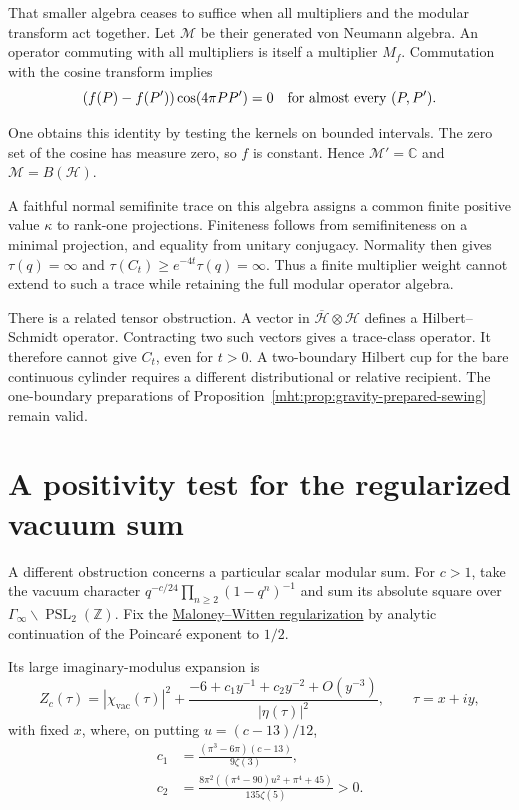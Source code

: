 That smaller algebra ceases to suffice when all multipliers and the
modular transform act together. Let $\mathcal M$ be their generated
von Neumann algebra. An operator commuting with all multipliers is
itself a multiplier $M_f$. Commutation with the cosine transform
implies
\[
 (f(P)-f(P'))\cos(4\pi PP')=0
 \quad\hbox{for almost every }(P,P').
\]

One obtains this identity by testing the kernels on bounded
intervals. The zero set of the cosine has measure zero, so $f$ is
constant. Hence $\mathcal M'= \mathbb C$ and
$\mathcal M=B(\mathcal H)$.

A faithful normal semifinite trace on this algebra assigns a common
finite positive value $\kappa$ to rank-one projections. Finiteness
follows from semifiniteness on a minimal projection, and equality
from unitary conjugacy. Normality then gives $\tau(q)=\infty$ and
$\tau(C_t)\geq e^{-4t}\tau(q)=\infty$.
Thus a finite multiplier weight cannot extend to such a trace while
retaining the full modular operator algebra.

There is a related tensor obstruction. A vector in
$\overline{\mathcal H}\otimes\mathcal H$ defines a
Hilbert--Schmidt operator. Contracting two such vectors gives a
trace-class operator. It therefore cannot give $C_t$, even for
$t>0$. A two-boundary Hilbert cup for the bare continuous cylinder
requires a different distributional or relative recipient.
The one-boundary preparations of
Proposition~\ref{mht:prop:gravity-prepared-sewing} remain valid.

\section{A positivity test for the regularized vacuum sum}

A different obstruction concerns a particular scalar modular sum.
For $c>1$, take the vacuum character
$q^{-c/24}\prod_{n\geq2}(1-q^n)^{-1}$ and sum its absolute square
over $\Gamma_\infty\backslash\operatorname{PSL}_2(\mathbb Z)$.
Fix the \href{https://arxiv.org/abs/0712.0155}{Maloney--Witten
regularization} by analytic continuation of the
Poincar\'e exponent to $1/2$.

Its large imaginary-modulus expansion is
\[
 Z_c(\tau)=|\chi_{\mathrm{vac}}(\tau)|^2+
 \frac{-6+c_1y^{-1}+c_2y^{-2}+O(y^{-3})}{|\eta(\tau)|^2},
 \qquad \tau=x+iy,
\]
with fixed $x$, where, on putting $u=(c-13)/12$,
\[
 \begin{aligned}
 c_1&=\frac{(\pi^3-6\pi)(c-13)}{9\zeta(3)},\\
 c_2&=\frac{8\pi^2((\pi^4-90)u^2+\pi^4+45)}{135\zeta(5)}>0.
 \end{aligned}
\]

